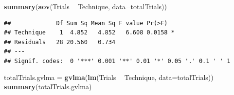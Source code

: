 \documentclass[]{article}
\newenvironment{Shaded}{\begin{snugshade}}{\end{snugshade}}
\newcommand{\DataTypeTok}[1]{\textcolor[rgb]{0.13,0.29,0.53}{#1}}
\newcommand{\KeywordTok}[1]{\textcolor[rgb]{0.13,0.29,0.53}{\textbf{#1}}}
\newcommand{\NormalTok}[1]{#1}
\newcommand{\OperatorTok}[1]{\textcolor[rgb]{0.81,0.36,0.00}{\textbf{#1}}}
\newcommand{\StringTok}[1]{\textcolor[rgb]{0.31,0.60,0.02}{#1}}
\begin{document}
\begin{Shaded}
\end{Shaded}

\begin{Shaded}
\begin{Highlighting}[]
\KeywordTok{summary}\NormalTok{(}\KeywordTok{aov}\NormalTok{(Trials }\OperatorTok{~}\StringTok{ }\NormalTok{Technique, }\DataTypeTok{data=}\NormalTok{totalTrials))}
\end{Highlighting}
\end{Shaded}

\begin{verbatim}
##             Df Sum Sq Mean Sq F value Pr(>F)  
## Technique    1  4.852   4.852   6.608 0.0158 *
## Residuals   28 20.560   0.734                 
## ---
## Signif. codes:  0 '***' 0.001 '**' 0.01 '*' 0.05 '.' 0.1 ' ' 1
\end{verbatim}

\begin{Shaded}
\begin{Highlighting}[]
\NormalTok{totalTrials.gvlma =}\StringTok{ }\KeywordTok{gvlma}\NormalTok{(}\KeywordTok{lm}\NormalTok{(Trials }\OperatorTok{~}\StringTok{ }\NormalTok{Technique, }\DataTypeTok{data=}\NormalTok{totalTrials))}
\KeywordTok{summary}\NormalTok{(totalTrials.gvlma)}
\end{Highlighting}
\end{Shaded}
\end{document}
